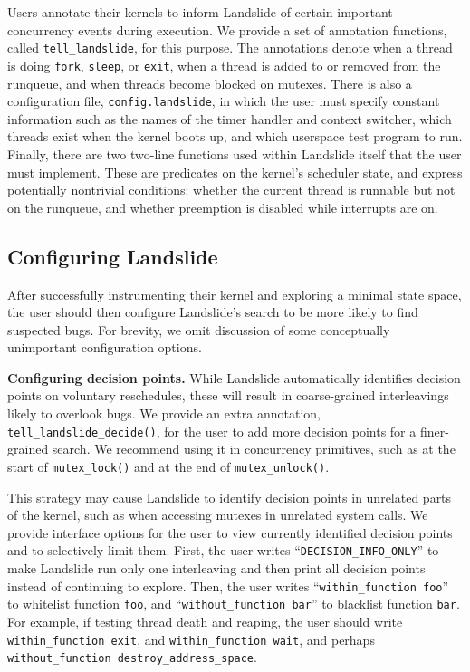 \documentclass{llncs}
\begin{document}
Users annotate their kernels to inform Landslide of certain important concurrency events during execution. We provide a set of annotation functions, called \texttt{tell\_landslide}, for this purpose. The annotations denote when a thread is doing \texttt{fork}, \texttt{sleep}, or \texttt{exit}, when a thread is added to or removed from the runqueue, and when threads become blocked on mutexes.
There is also a configuration file, \texttt{config.landslide}, in which the user must specify constant information such as the names of the timer handler and context switcher, which threads exist when the kernel boots up, and which userspace test program to run.
Finally, there are two two-line functions used within Landslide itself that the user must implement. These are predicates on the kernel's scheduler state, and express potentially nontrivial conditions: whether the current thread is runnable but not on the runqueue, and whether preemption is disabled while interrupts are on.

\subsection{Configuring Landslide}
\label{sec:config}

After successfully instrumenting their kernel and exploring a minimal state space, the user should then configure Landslide's search to be more likely to find suspected bugs. For brevity, we omit discussion of some conceptually unimportant configuration options.

{\bf Configuring decision points.} While Landslide automatically identifies decision points on voluntary reschedules, these will result in coarse-grained interleavings likely to overlook bugs. We provide an extra annotation, \texttt{tell\_landslide\_decide()}, for the user to add more decision points for a finer-grained search. We recommend using it in concurrency primitives, such as at the start of \texttt{mutex\_lock()} and at the end of \texttt{mutex\_unlock()}. 

This strategy may cause Landslide to identify decision points in unrelated parts of the kernel, such as when accessing mutexes in unrelated system calls. We provide interface options for the user to view currently identified decision points and to selectively limit them. First, the user writes ``\texttt{DECISION\_INFO\_ONLY}'' to make Landslide run only one interleaving and then print all decision points instead of continuing to explore. Then, the user writes ``\texttt{within\_function foo}'' to whitelist function \texttt{foo}, and ``\texttt{without\_function bar}'' to blacklist function \texttt{bar}. For example, if testing thread death and reaping, the user should write \texttt{within\_function exit}, and \texttt{within\_function wait}, and perhaps \texttt{without\_function destroy\_address\_space}.
\end{document}
